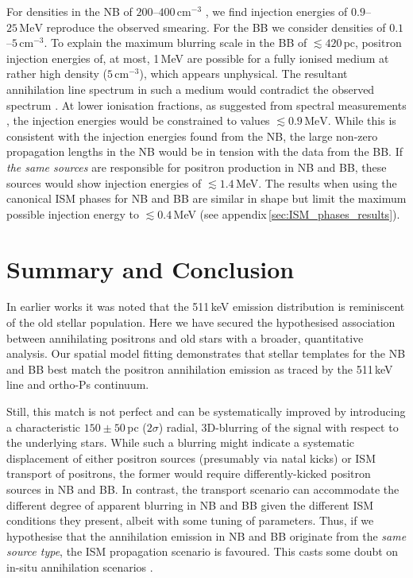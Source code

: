 \documentclass[doublespace,nopageskip]{VTthesis} %
\begin{document}
	
	For densities in the NB of $200$--$400\,\mathrm{cm^{-3}}$ \citep{Launhardt2002_NB}, we find injection energies of $0.9$--$25\,\mathrm{MeV}$ reproduce the observed smearing.
	For the BB we consider densities of $0.1$--$5\,\mathrm{cm^{-3}}$.
	To explain the maximum blurring scale in the BB of $\lesssim 420\,\mathrm{pc}$, positron injection energies of, at most, 1\,MeV are possible for a fully ionised medium at rather high density ($5\,\mathrm{cm^{-3}}$), which appears unphysical.
	The resultant annihilation line spectrum in such a medium would contradict the observed spectrum \citep{Guessoum2005_511,Siegert2019_lv511}.
	At lower ionisation fractions, as suggested from spectral measurements \citep{Jean2006_511,Churazov2005_511}, the injection energies would be constrained to values $\lesssim 0.9\,\mathrm{MeV}$.
	While this is consistent with the injection energies found from the NB, the large non-zero propagation lengths in the NB would be in tension with the data from the BB.
	If \textit{the same sources} are responsible for positron production in NB and BB, these sources would show injection energies of $\lesssim 1.4$\,MeV.
	The results when using the canonical ISM phases for NB and BB are similar in shape but limit the maximum possible injection energy to $\lesssim 0.4$\,MeV (see appendix\,\ref{sec:ISM_phases_results}). 
	
	
	
	\section{Summary and Conclusion}\label{sec:summary}
	In earlier works \citep[e.g.,][]{Knoedlseder2005_511,Bouchet2011_diffuseCR} it was noted that the 511\,keV emission distribution is reminiscent of the old stellar population.
	Here we have  secured the hypothesised 
	association between annihilating
	positrons and old stars with a broader, quantitative analysis.
	Our spatial model fitting demonstrates that stellar templates for the NB and BB best match the positron annihilation emission as traced by the 511\,keV line and ortho-Ps continuum.
	
	Still, this match is not perfect and can be systematically improved by introducing a characteristic $150 \pm 50$\,pc ($2\sigma$)
	radial, 3D-blurring of the signal with respect to the underlying stars.
	While such a blurring might indicate a systematic displacement of either positron sources (presumably via natal kicks) or ISM transport of positrons, the former would require differently-kicked positron sources in NB and BB.
	In contrast, the transport scenario can accommodate the different degree of apparent blurring in NB and BB given the different ISM conditions they present, albeit with some tuning of parameters.
	Thus, if we hypothesise that the annihilation emission in NB and BB originate from the \textit{same source type}, the ISM propagation scenario is favoured.
	This casts some doubt on in-situ annihilation scenarios \citep[e.g.,][]{Bisnovatyi-Kogan2017_511}.
	
\end{document}
